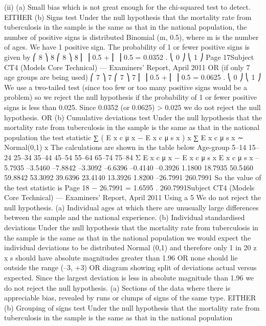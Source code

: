 \documentclass[a4paper,12pt]{article}
\begin{document}
\begin{enumerate}
(ii)
(a)
Small bias which is not great enough for the chi-squared test to detect.
EITHER
(b)
Signs test
Under the null hypothesis that the mortality rate from tuberculosis in the
sample is the same as that in the national population,
the number of positive signs is distributed Binomial (m, 0.5), where m is the
number of ages.
We have 1 positive sign.
The probability of 1 or fewer positive signs is given by
⎛ 8 ⎞ 8 ⎛ 8 ⎞ 8
⎜ ⎟ 0.5 + ⎜ ⎟ 0.5 = 0.0352 .
⎝ 0 ⎠
⎝ 1 ⎠
Page 17Subject CT4 (Models Core Technical) — Examiners’ Report, April 2011
OR (if only 7 age groups are being used)
⎛ 7 ⎞ 7 ⎛ 7 ⎞ 7
⎜ ⎟ 0.5 + ⎜ ⎟ 0.5 = 0.0625 .
⎝ 0 ⎠
⎝ 1 ⎠
We use a two-tailed test (since too few or too many positive signs would be a
problem)
so we reject the null hypothesis if the probability of 1 or fewer positive signs
is less than 0.025.
Since 0.0352 (or 0.0625) > 0.025
we do not reject the null hypothesis.
OR
(b)
Cumulative deviations test
Under the null hypothesis that the mortality rate from tuberculosis in the
sample is the same as that in the national population
the test statistic
∑ ( E x c μ x − E x c μ s x )
x
∑ E x c μ s x
∼ Normal(0,1)
x
The calculations are shown in the table below
Age-group
5–14
15–24
25–34
35–44
45–54
55–64
65–74
75–84
Σ
E x c μ x − E x c μ s x E x c μ s x
–5.7935
–3.5460
–7.8842
–3.3092
–6.6396
–0.4140
–0.3926
1.1800 18.7935
50.5460
59.8842
53.3092
39.6396
23.4140
13.3926
1.8200
–26.7991 260.7991
So the value of the test statistic is
Page 18
− 26.7991
= 1.6595 .
260.7991Subject CT4 (Models Core Technical) — Examiners’ Report, April 2011
Using a 5%
We do not reject the null hypothesis.
(a) Individual ages at which there are unusually large differences between the
sample and the national experience.
(b) Individual standardised deviations
Under the null hypothesis that the mortality rate from tuberculosis in the
sample is the same as that in the national population
we would expect the individual deviations to be distributed Normal (0,1)
and therefore only 1 in 20 z x s should have absolute magnitudes greater than
1.96
OR
none should lie outside the range (–3, +3)
OR
diagram showing split of deviations actual versus expected.
Since the largest deviation is less in absolute magnitude than 1.96 we do not
reject the null hypothesis.
(a)
Sections of the data where there is appreciable bias, revealed by runs or
clumps of signs of the same type.
EITHER
(b)
Grouping of signs test
Under the null hypothesis that the mortality rate from tuberculosis in the
sample is the same as that in the national population

\end{enumerate}
\end{document}
